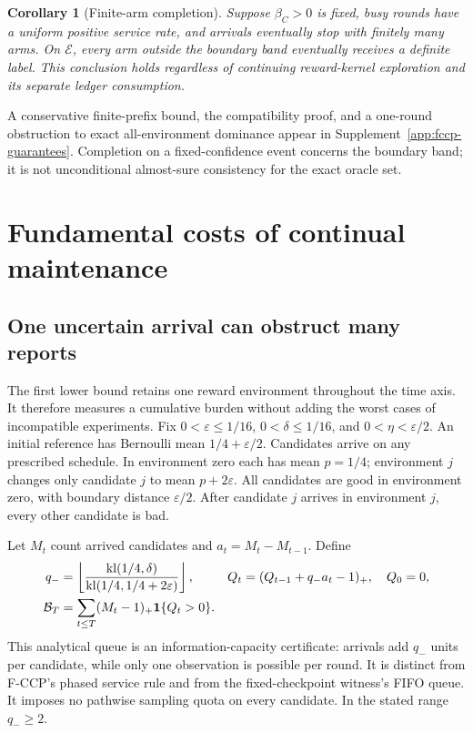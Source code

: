 \documentclass[11pt]{article}
\newtheorem{corollary}[theorem]{Corollary}
\theoremstyle{remark}
\newcommand{\ind}{\mathbf 1}
\newcommand{\kl}{\operatorname{kl}}
\begin{document}
\begin{corollary}[Finite-arm completion]\label{cor:fccp-finite}
Suppose $\beta_C>0$ is fixed, busy rounds have a uniform positive service
rate, and arrivals eventually stop with finitely many arms. On
$\mathcal E$, every arm outside the boundary band eventually receives
a definite label. This conclusion holds regardless of continuing
reward-kernel exploration and its separate ledger consumption.
\end{corollary}
A conservative finite-prefix bound, the compatibility proof, and a
one-round obstruction to exact all-environment dominance appear in
Supplement~\ref{app:fccp-guarantees}. Completion on a fixed-confidence
event concerns the boundary band; it is not unconditional almost-sure
consistency for the exact oracle set.
\section{Fundamental costs of continual maintenance}
\label{sec:maintenance}

\subsection{One uncertain arrival can obstruct many reports}

The first lower bound retains one reward environment throughout the time axis.
It therefore measures a cumulative burden without adding the worst cases of
incompatible experiments. Fix
$0<\varepsilon\le1/16$, $0<\delta\le1/16$, and $0<\eta<\varepsilon/2$.
An initial reference has Bernoulli mean $1/4+\varepsilon/2$. Candidates arrive
on any prescribed schedule. In environment zero each has mean $p=1/4$;
environment $j$ changes only candidate $j$ to mean $p+2\varepsilon$.
All candidates are good in environment zero, with boundary distance
$\varepsilon/2$. After candidate $j$ arrives in environment $j$, every other
candidate is bad.

Let $M_t$ count arrived candidates and $a_t=M_t-M_{t-1}$. Define
\begin{align}
 q_-&=\left\lfloor\frac{\kl(1/4,\delta)}
                              {\kl(1/4,1/4+2\varepsilon)}\right\rfloor,
 &Q_t&=(Q_{t-1}+q_-a_t-1)_+,\quad Q_0=0,\notag\\
 \mathcal B_T&=\sum_{t\le T}(M_t-1)_+\ind\{Q_t>0\}.
 \label{eq:broadcast_queue}
\end{align}
This analytical queue is an information-capacity certificate: arrivals add
$q_-$ units per candidate, while only one observation is possible per round.
It is distinct from F-CCP's phased service rule and from the
fixed-checkpoint witness's FIFO queue. It imposes no pathwise sampling
quota on every candidate. In the stated
range $q_-\ge2$.
\end{document}

